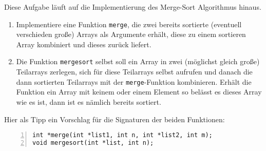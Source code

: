 \begin{aufg}
Diese Aufgabe läuft auf die Implementierung des Merge-Sort Algorithmus hinaus.
\begin{enumerate}
\item Implementiere eine Funktion \verb|merge|, die zwei bereits sortierte (eventuell verschieden große) Arrays als Argumente erhält, diese zu einem sortieren Array kombiniert und dieses zurück liefert. 
\item Die Funktion \verb|mergesort| selbst soll ein Array in zwei (möglichst gleich große) Teilarrays zerlegen, sich für diese Teilarrays selbst aufrufen und danach die dann sortierten Teilarrays mit der \verb|merge|-Funktion kombinieren. Erhält die Funktion ein Array mit keinem oder einem Element so belässt es dieses Array wie es ist, dann ist es nämlich bereits sortiert.
\end{enumerate}

Hier als Tipp ein Vorschlag für die Signaturen der beiden Funktionen:
\begin{codelisting}
\begin{lstlisting}[numbers=left,numberstyle=\tiny,frame=tlrb]
int *merge(int *list1, int n, int *list2, int m);
void mergesort(int *list, int n);
\end{lstlisting}
\end{codelisting}

\end{aufg}